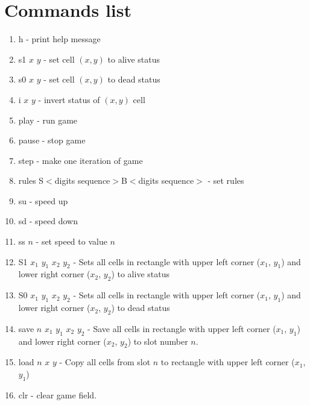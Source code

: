 \section*{Commands list}

\begin{enumerate}
	\item \textsf{h} - print help message
	\item \textsf{s1 $x$ $y$} - set cell $(x, y)$ to alive status
	\item \textsf{s0 $x$ $y$} - set cell $(x, y)$ to dead status
	\item \textsf{i $x$ $y$} - invert status of $(x, y)$ cell
	\item \textsf{play} - run game
	\item \textsf{pause} - stop game
	\item \textsf{step} - make one iteration of game
	\item \textsf{rules S$<$digits sequence$>$B$<$digits sequence$>$} - set rules
	\item \textsf{su} - speed up
	\item \textsf{sd} - speed down
	\item \textsf{ss $n$} - set speed to value $n$
	\item \textsf{S1 $x_{1}$ $y_{1}$ $x_{2}$ $y_{2}$} -  Sets all cells in rectangle with upper left corner ($x_{1}$, $y_{1}$) and lower right corner ($x_{2}$, $y_{2}$) to alive status
	\item \textsf{S0 $x_{1}$ $y_{1}$ $x_{2}$ $y_{2}$} -  Sets all cells in rectangle with upper left corner ($x_{1}$, $y_{1}$) and lower right corner ($x_{2}$, $y_{2}$) to dead status
	\item \textsf{save $n$ $x_{1}$ $y_{1}$ $x_{2}$ $y_{2}$} - Save all cells in rectangle with upper left corner ($x_{1}$, $y_{1}$) and lower right corner ($x_{2}$, $y_{2}$) to slot number $n$.
	\item \textsf{load $n$ $x$ $y$} - Copy all cells from slot $n$ to rectangle with upper left corner ($x_{1}$, $y_{1}$)
	\item \textsf{clr} - clear game field.
\end{enumerate}
